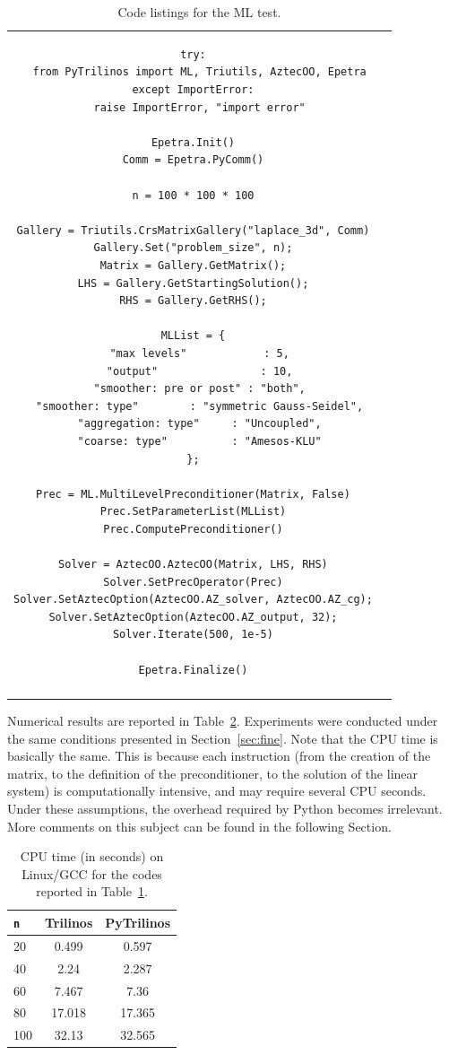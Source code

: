 \documentclass[acmtocl]{acmtrans2m}
\begin{document}
\begin{table}
\begin{tabular}{| c  | c|}
\begin{minipage}{10.5cm}
\begin{verbatim}
try:
  from PyTrilinos import ML, Triutils, AztecOO, Epetra
except ImportError:
  raise ImportError, "import error"

Epetra.Init()
Comm = Epetra.PyComm()

n = 100 * 100 * 100

Gallery = Triutils.CrsMatrixGallery("laplace_3d", Comm)
Gallery.Set("problem_size", n);
Matrix = Gallery.GetMatrix();
LHS = Gallery.GetStartingSolution();
RHS = Gallery.GetRHS();

MLList = {
  "max levels"            : 5,
  "output"                : 10,
  "smoother: pre or post" : "both",
  "smoother: type"        : "symmetric Gauss-Seidel",
  "aggregation: type"     : "Uncoupled",
  "coarse: type"          : "Amesos-KLU"
};

Prec = ML.MultiLevelPreconditioner(Matrix, False)
Prec.SetParameterList(MLList)
Prec.ComputePreconditioner()

Solver = AztecOO.AztecOO(Matrix, LHS, RHS)
Solver.SetPrecOperator(Prec)
Solver.SetAztecOption(AztecOO.AZ_solver, AztecOO.AZ_cg);
Solver.SetAztecOption(AztecOO.AZ_output, 32);
Solver.Iterate(500, 1e-5)

Epetra.Finalize()
\end{verbatim}
\end{minipage}
\\
&  \\
\hline
\end{tabular}
\caption{Code listings for the ML test.}
\label{tab:code_ml}
\end{table}

Numerical results are reported in Table~\ref{tab:time_ml}. Experiments were
conducted under the same conditions presented in Section~\ref{sec:fine}. Note
that the CPU time is basically the same. This is because each instruction
(from the creation of the matrix, to the definition of the preconditioner, to
 the solution of the linear system) is computationally intensive, and may
require several CPU seconds. Under these assumptions, the overhead required by
Python becomes irrelevant. More comments on this subject can be found in the
following Section.

\begin{table}
\begin{center}
\begin{tabular}{| l | c | c |}
\hline
\tt n & Trilinos & PyTrilinos \\
\hline
20  & 0.499  & 0.597 \\
40  & 2.24   & 2.287 \\
60  & 7.467  & 7.36 \\
80  & 17.018 & 17.365 \\
100 & 32.13  & 32.565 \\
\hline
\end{tabular}
\caption{CPU time (in seconds) on Linux/GCC for the codes reported in
Table~\ref{tab:code_ml}.}
\label{tab:time_ml}
\end{center}
\end{table}
\end{document}
